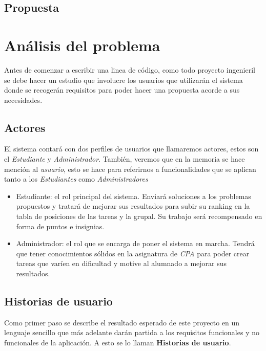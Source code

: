 \documentclass[11pt,spanish,listoffigures,listoftables]{tfgetsinf}
\begin{document}
\section{Propuesta}


\chapter{Análisis del problema}

Antes de comenzar a escribir una linea de código, como todo proyecto ingenieril se debe hacer un estudio que involucre los usuarios que utilizarán el sistema donde se recogerán requisitos para poder hacer una propuesta acorde a sus necesidades.

\section{Actores}

El sistema contará con dos perfiles de usuarios que llamaremos actores, estos son el \textit{Estudiante} y \textit{Administrador}. También, veremos que en la memoria se hace mención al \textit{usuario}, esto se hace para referirnos a funcionalidades que se aplican tanto a los \textit{Estudiantes} como \textit{Administradores}

\begin{itemize}
	\item Estudiante: el rol principal del sistema. Enviará soluciones a los problemas propuestos y tratará de mejorar sus resultados para subir su ranking en la tabla de posiciones de las tareas y la grupal. Su trabajo será recompensado en forma de puntos e insignias.
	\item Administrador: el rol que se encarga de poner el sistema en marcha. Tendrá que tener conocimientos sólidos en la asignatura de \textit{CPA} para poder crear tareas que varíen en dificultad y motive al alumnado a mejorar sus resultados.
\end{itemize}


\section{Historias de usuario}

Como primer paso se describe el resultado esperado de este proyecto en un lenguaje sencillo que más adelante darán partida a los requisitos funcionales y no funcionales de la aplicación. A esto se lo llaman \textbf{Historias de usuario}.
\end{document}
